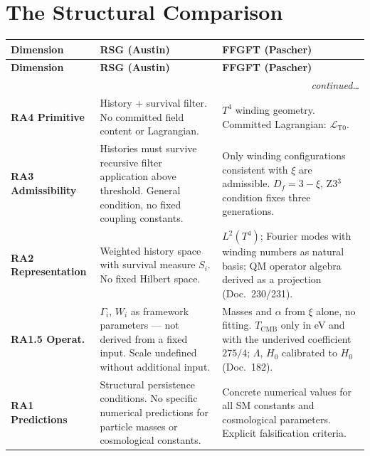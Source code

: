 \section{The Structural Comparison}

\renewcommand{\arraystretch}{1.5}
{\small
\begin{longtable}{p{3.5cm}p{5.0cm}p{5.0cm}}
\toprule
\textbf{Dimension} & \textbf{RSG (Austin)} & \textbf{FFGFT (Pascher)} \\
\midrule
\endfirsthead
\toprule
\textbf{Dimension} & \textbf{RSG (Austin)} & \textbf{FFGFT (Pascher)} \\
\midrule
\endhead
\midrule\multicolumn{3}{r}{\footnotesize\itshape continued\ldots}\\\endfoot
\bottomrule\endlastfoot

\textbf{RA4 Primitive} &
History + survival filter. No committed field content or Lagrangian. &
$T^4$ winding geometry. Committed Lagrangian: $\mathcal{L}_{\text{T0}}$. \\

\midrule

\textbf{RA3 Admissibility} &
Histories must survive recursive filter application above threshold.
General condition, no fixed coupling constants. &
Only winding configurations consistent with $\xi$ are admissible.
$D_f = 3-\xi$, Z3$^3$ condition fixes three generations. \\

\midrule

\textbf{RA2 Representation} &
Weighted history space with survival measure $S_i$. No fixed Hilbert space. &
$L^2(T^4)$; Fourier modes with winding numbers as natural basis;
QM operator algebra derived as a projection (Doc.~230/231). \\

\midrule

\textbf{RA1.5 Operat.} &
$\Gamma_i$, $W_i$ as framework parameters — not derived from a fixed input.
Scale undefined without additional input. &
Masses and $\alpha$ from $\xi$ alone, no fitting. $T_\text{CMB}$ only in eV
and with the underived coefficient $275/4$; $\Lambda$, $H_0$ calibrated to
$H_0$ (Doc.~182). \\

\midrule

\textbf{RA1 Predictions} &
Structural persistence conditions. No specific numerical
predictions for particle masses or cosmological constants. &
Concrete numerical values for all SM constants and cosmological
parameters. Explicit falsification criteria. \\


\end{longtable}}
